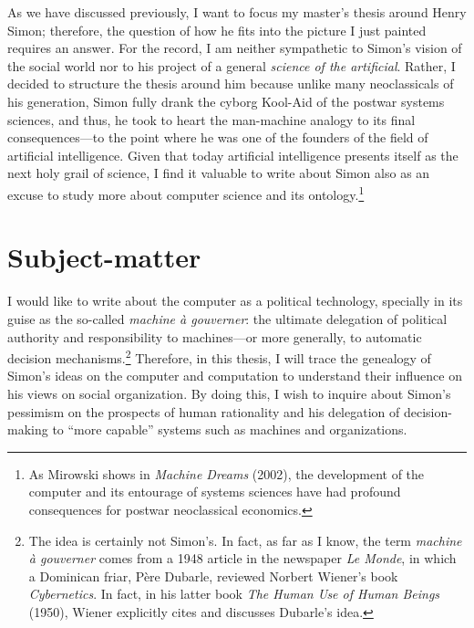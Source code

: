 \documentclass[paper=A4,portrait,twoside=true,twocolumn=true,headinclude=false,footinclude=false,fontsize=10,BCOR=15mm,DIV=13,pagesize=auto,titlepage=firstiscover,mpinclude=true,open=right,chapterprefix=true,numbers=autoendperiod,headsepline=false,parskip=false]{scrbook}
\theoremstyle{definition}
\begin{document}
As we have discussed previously, I want to focus my master's thesis around
Henry Simon; therefore, the question of how he fits into the picture I just
painted requires an answer. For the record, I am neither sympathetic to
Simon's vision of the social world nor to his project of a general \emph{science
of the artificial}. Rather, I decided to structure the thesis around him
because unlike many neoclassicals of his generation, Simon fully drank the
cyborg Kool-Aid of the postwar systems sciences, and thus, he took to heart
the man-machine analogy to its final consequences---to the point where he
was one of the founders of the field of artificial intelligence. Given that
today artificial intelligence presents itself as the next holy grail of
science, I find it valuable to write about Simon also as an excuse to study
more about computer science and its ontology.\footnote{As Mirowski shows in \emph{Machine Dreams} (2002), the development of the
computer and its entourage of systems sciences have had profound
consequences for postwar neoclassical economics.} 
\section{Subject-matter}
\label{sec:orgdb5539b}
I would like to write about the computer as a political technology,
specially in its guise as the so-called \emph{machine à gouverner}: the ultimate
delegation of political authority and responsibility to machines---or more
generally, to automatic decision mechanisms.\footnote{The idea is certainly not Simon's. In fact, as far as I know, the
term \emph{machine à gouverner} comes from a 1948 article in the newspaper \emph{Le
Monde}, in which a Dominican friar, Père Dubarle, reviewed Norbert Wiener's
book \emph{Cybernetics}. In fact, in his latter book \emph{The Human Use of Human
Beings} (1950), Wiener explicitly cites and discusses Dubarle's idea.} Therefore, in this
thesis, I will trace the genealogy of Simon's ideas on the computer and
computation to understand their influence on his views on social
organization. By doing this, I wish to inquire about Simon's pessimism on
the prospects of human rationality and his delegation of decision-making to
``more capable'' systems such as machines and organizations.
\end{document}

